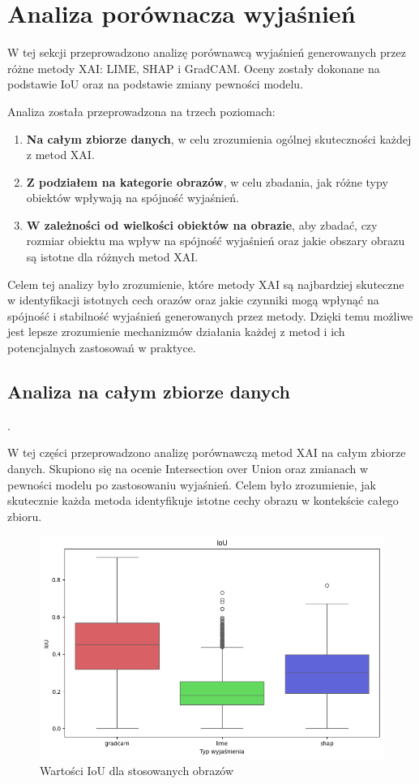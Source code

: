 \section*{Analiza porównacza wyjaśnień}
W tej sekcji przeprowadzono analizę porównawcą wyjaśnień generowanych przez różne metody XAI: LIME, SHAP i GradCAM.
Oceny zostały dokonane na podstawie IoU oraz na podstawie zmiany pewności modelu.

Analiza została przeprowadzona na trzech poziomach:
\begin{enumerate}
	\item \textbf{Na całym zbiorze danych}, w celu zrozumienia ogólnej skuteczności każdej z metod XAI.
	\item \textbf{Z podziałem na kategorie obrazów}, w celu zbadania, jak różne typy obiektów wpływają na spójność wyjaśnień.
	\item \textbf{W zależności od wielkości obiektów na obrazie}, aby zbadać, czy rozmiar obiektu ma wpływ na spójność wyjaśnień oraz jakie obszary obrazu są istotne dla różnych metod XAI.
\end{enumerate}

Celem tej analizy było zrozumienie, które metody XAI są najbardziej skuteczne w identyfikacji istotnych cech orazów oraz jakie czynniki mogą wpłynąć na spójność i stabilność wyjaśnień generowanych przez metody.
Dzięki temu możliwe jest lepsze zrozumienie mechanizmów działania każdej z metod i ich potencjalnych zastosowań w praktyce.

\subsection*{Analiza na całym zbiorze danych}.

W tej części przeprowadzono analizę porównawczą metod XAI na całym zbiorze danych.
Skupiono się na ocenie Intersection over Union oraz zmianach w pewności modelu po zastosowaniu wyjaśnień.
Celem było zrozumienie, jak skutecznie każda metoda identyfikuje istotne cechy obrazu w kontekście całego zbioru.

\begin{figure}[h]
	\centering\includegraphics[width=.9\textwidth]{img/base_iou}
	\caption{Wartości IoU  dla stosowanych obrazów}  \label{rys:basiciou}
\end{figure}

